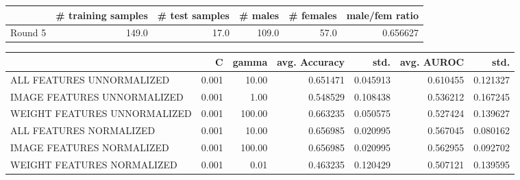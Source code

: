 \begin{tabular}{lrrrrr}
\hline
{} &  \# training samples &  \# test samples &  \# males &  \# females &  male/fem ratio \\
\hline
Round 5 &               149.0 &            17.0 &    109.0 &       57.0 &        0.656627 \\
\hline
\end{tabular}
\begin{tabular}{lrrrrrr}
\hline
{} &      C &   gamma &  avg. Accuracy &      std. &  avg. AUROC &      std. \\
\hline
ALL FEATURES UNNORMALIZED    &  0.001 &   10.00 &       0.651471 &  0.045913 &    0.610455 &  0.121327 \\
IMAGE FEATURES UNNORMALIZED  &  0.001 &    1.00 &       0.548529 &  0.108438 &    0.536212 &  0.167245 \\
WEIGHT FEATURES UNNORMALIZED &  0.001 &  100.00 &       0.663235 &  0.050575 &    0.527424 &  0.139627 \\
ALL FEATURES NORMALIZED      &  0.001 &   10.00 &       0.656985 &  0.020995 &    0.567045 &  0.080162 \\
IMAGE FEATURES NORMALIZED    &  0.001 &  100.00 &       0.656985 &  0.020995 &    0.562955 &  0.092702 \\
WEIGHT FEATURES NORMALIZED   &  0.001 &    0.01 &       0.463235 &  0.120429 &    0.507121 &  0.139595 \\
\hline
\end{tabular}
